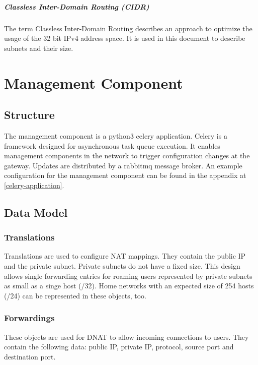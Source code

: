 \documentclass{report}
\begin{document}
\paragraph{Classless Inter-Domain Routing (CIDR)}

The term Classless Inter-Domain Routing describes an approach to optimize
the usage of the 32 bit IPv4 address space. It is used in this document
to describe subnets and their size.

\chapter{Management Component}\label{management-component}

\section{Structure}\label{structure}

The management component is a python3 celery application. Celery is a
framework designed for asynchronous task queue execution\cite{celery}. It
enables management components in the network to trigger
configuration changes at the gateway. Updates are distributed by a rabbitmq message
broker\cite{rabbit}. An example configuration for the management component
can be found in the appendix at \ref{celery-application}.


\section{Data Model}\label{data-model}

\subsection{Translations}\label{translations}

Translations are used to configure NAT mappings. They contain the public
IP and the private subnet. Private subnets do not have a fixed size.
This design allows single forwarding entries for roaming users represented by
private subnets as small as a singe host (/32). Home networks with an expected
size of 254 hosts (/24) can be represented in these objects, too.

\subsection{Forwardings}\label{forwardings}

These objects are used for DNAT to allow incoming connections to users.
They contain the following data: public IP, private IP, protocol, source
port and destination port.
\end{document}
